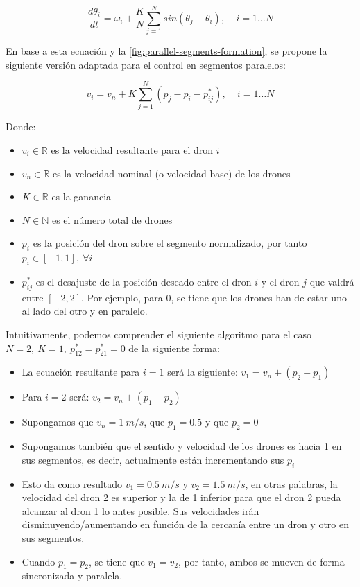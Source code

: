 \begin{equation}\label{eq:kuramoto}
    \frac{d\theta_i}{dt} = \omega_i + \frac{K}{N} \sum_{j=1}^{N} sin(\theta_j - \theta_i), 
    \ \ \ \ \ i = 1 \ldots N
\end{equation}

En base a esta ecuación y la \autoref{fig:parallel-segments-formation}, 
se propone la siguiente versión adaptada para el control en segmentos paralelos:

\begin{equation}\label{eq:segment-formation}
    v_i = v_n + K \sum_{j=1}^{N} (p_j - p_i - p^{*}_{ij}), 
    \ \ \ \ \ i = 1 \ldots N
\end{equation}

Donde:

\begin{itemize}
    \item $v_i \in \mathbb{R}$ es la velocidad resultante para el dron $i$
    \item $v_n \in \mathbb{R}$ es la velocidad nominal (o velocidad base) de los drones
    \item $K \in \mathbb{R}$ es la ganancia
    \item $N \in \mathbb{N}$ es el número total de drones
    \item $p_i$ es la posición del dron sobre el segmento normalizado, 
    por tanto $p_i \in [-1, 1], \ \forall i$
    \item $p^{*}_{ij}$ es el desajuste de la posición deseado entre el dron $i$ 
    y el dron $j$ que valdrá entre $[-2, 2]$. Por ejemplo, para 0, 
    se tiene que los drones han de estar uno al lado del otro y en paralelo.
\end{itemize}

Intuitivamente, podemos comprender el siguiente algoritmo para el caso 
$N = 2, \ K = 1, \ p^{*}_{12} = p^{*}_{21} = 0$ de la siguiente forma:

\begin{itemize}
    \item La ecuación resultante para $i = 1$ será la siguiente: $v_1 = v_n + (p_2 - p_1)$
    \item Para $i = 2$ será: $v_2 = v_n + (p_1 - p_2)$
    \item Supongamos que $v_n = 1 \ m/s$, que $p_1 = 0.5$ y que $p_2 = 0$
    \item Supongamos también que el sentido y velocidad de los drones es hacia 1 en sus segmentos, 
    es decir, actualmente están incrementando sus $p_i$
    \item Esto da como resultado $v_1 = 0.5 \ m/s$ y $v_2 = 1.5 \ m/s$, en otras palabras, la velocidad
    del dron 2 es superior y la de 1 inferior para que el dron 2 pueda alcanzar al dron 1 lo antes posible.
    Sus velocidades irán disminuyendo/aumentando en función de la cercanía entre un dron y otro en sus segmentos.
    \item Cuando $p_1 = p_2$, se tiene que $v_1 = v_2$, por tanto, ambos se mueven de forma sincronizada y paralela.
\end{itemize}

